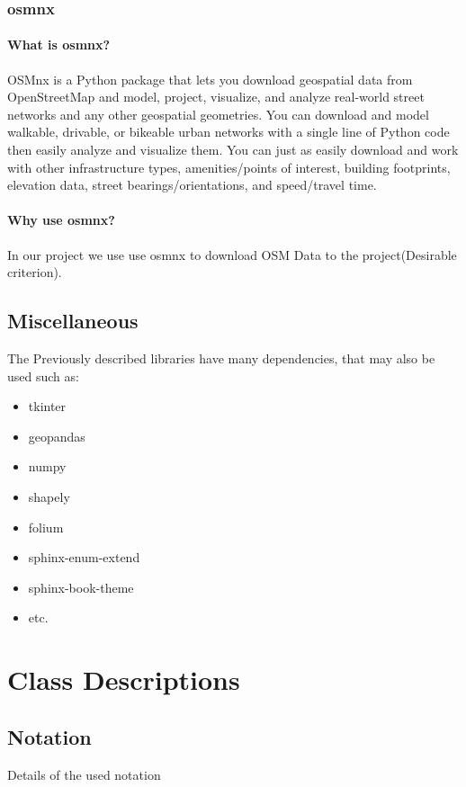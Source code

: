 \documentclass[parskip=full]{scrartcl} %
\begin{document}
\subsubsection{osmnx}

\paragraph{What is osmnx?}
OSMnx is a Python package that lets you download geospatial data from OpenStreetMap and model, project, visualize, and analyze real-world street networks and any other geospatial geometries. You can download and model walkable, drivable, or bikeable urban networks with a single line of Python code then easily analyze and visualize them. You can just as easily download and work with other infrastructure types, amenities/points of interest, building footprints, elevation data, street bearings/orientations, and speed/travel time.

\paragraph{Why use osmnx?}
In our project we use use osmnx to download OSM Data to the project(Desirable criterion).

\subsection{Miscellaneous}
The Previously described libraries have many dependencies, that may also be used such as:
\begin{itemize}
    \item tkinter
    \item geopandas
    \item numpy
    \item shapely
    \item folium
    \item sphinx-enum-extend
    \item sphinx-book-theme 
    \item etc.
\end{itemize}
\newpage




\section{Class Descriptions} \label{sec::descriptions}
\subsection{Notation}
Details of the used notation
\end{document}
